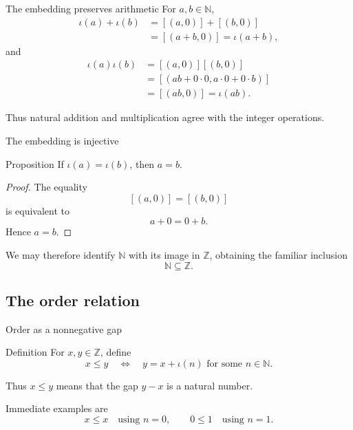 \documentclass[aspectratio=169,11pt]{beamer}
\newcommand{\N}{\mathbb N}
\newcommand{\Z}{\mathbb Z}
\newcommand{\cl}[2]{\left[(#1,#2)\right]}
\begin{document}
\begin{frame}{The embedding preserves arithmetic}
  For \(a,b\in\N\),
  \begin{align*}
    \iota(a)+\iota(b)
      &=\cl{a}{0}+\cl{b}{0}\\
      &=\cl{a+b}{0}
       =\iota(a+b),
  \end{align*}
  and
  \begin{align*}
    \iota(a)\iota(b)
      &=\cl{a}{0}\cl{b}{0}\\
      &=\cl{ab+0\cdot0}{a\cdot0+0\cdot b}\\
      &=\cl{ab}{0}
       =\iota(ab).
  \end{align*}

  Thus natural addition and multiplication agree with the integer operations.
\end{frame}

\begin{frame}{The embedding is injective}
  \begin{block}{Proposition}
    If \(\iota(a)=\iota(b)\), then \(a=b\).
  \end{block}

  \begin{proof}
    The equality
    \[
      \cl{a}{0}=\cl{b}{0}
    \]
    is equivalent to
    \[
      a+0=0+b.
    \]
    Hence \(a=b\).
  \end{proof}

  We may therefore identify \(\N\) with its image in \(\Z\), obtaining the
  familiar inclusion
  \[
    \N\subseteq\Z.
  \]
\end{frame}

\subsection{The order relation}

\begin{frame}{Order as a nonnegative gap}
  \begin{block}{Definition}
    For \(x,y\in\Z\), define
    \[
      \boxed{x\le y
      \quad\Longleftrightarrow\quad
      y=x+\iota(n)\text{ for some }n\in\N.}
    \]
  \end{block}

  Thus \(x\le y\) means that the gap \(y-x\) is a natural number.

  Immediate examples are
  \[
    x\le x
    \quad\text{using }n=0,
    \qquad
    0\le1
    \quad\text{using }n=1.
  \]
\end{frame}
\end{document}
